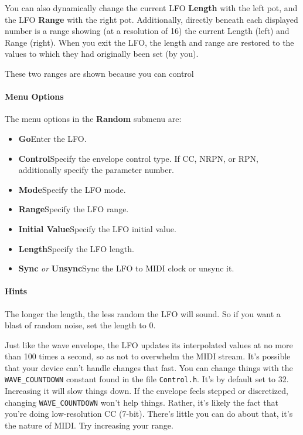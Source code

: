 \documentclass{article}
\begin{document}
You can also dynamically change the current LFO {\bf Length} with the left pot, and the LFO {\bf Range} with the right pot.  Additionally, directly beneath each displayed number is a range showing (at a resolution of 16) the current Length (left) and Range (right).  When you exit the LFO, the length and range are restored to the values to which they had originally been set (by you).

These two ranges are shown because you can control

\paragraph{Menu Options}  The menu options in the {\bf Random} submenu are:

\begin{itemize}
\item {\bf Go}\quad Enter the LFO.  
\item {\bf Control}\quad Specify the envelope control type.  If CC, NRPN, or RPN, additionally specify the parameter number. 
\item {\bf Mode}\quad Specify the LFO mode.
\item {\bf Range}\quad Specify the LFO range.
\item {\bf Initial Value}\quad Specify the LFO initial value.
\item {\bf Length}\quad Specify the LFO length.
\item {\bf Sync} {\it or} {\bf Unsync}\quad Sync the LFO to MIDI clock or unsync it.
\end{itemize}

\paragraph{Hints}
The longer the length, the less random the LFO will sound.  So if you want a blast of random noise, set the length to 0.

Just like the wave envelope, the LFO updates its interpolated values at no more than 100 times a second, so as not to overwhelm the MIDI stream.  It's possible that your device can't handle changes that fast.  You can change things with the \texttt{WAVE\_COUNTDOWN} constant found in the file \texttt{Control.h}. It's by default set to 32.  Increasing it will slow things down.  If the envelope feels stepped or discretized, changing \texttt{WAVE\_COUNTDOWN} won't help things.  Rather, it's likely the fact that you're doing low-resolution CC (7-bit).  There's little you can do about that, it's the nature of MIDI.  Try increasing your range.
\end{document}
